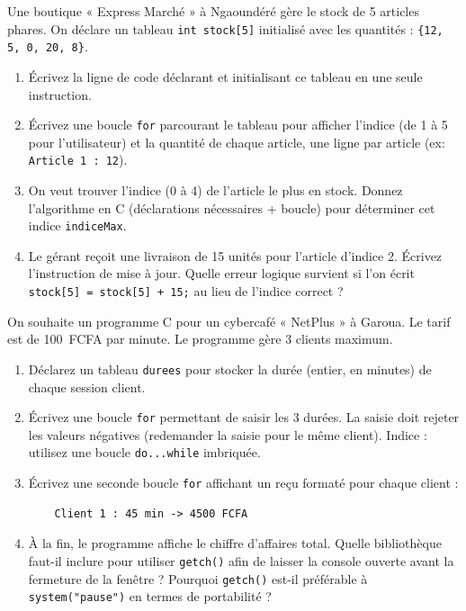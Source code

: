\documentclass[11pt]{article}
\begin{document}
\begin{exercice}
Une boutique « Express Marché » à Ngaoundéré gère le stock de 5 articles phares. On déclare un tableau \texttt{int stock[5]} initialisé avec les quantités : \texttt{\{12, 5, 0, 20, 8\}}.
\begin{enumerate}
    \item Écrivez la ligne de code déclarant et initialisant ce tableau en une seule instruction.
    \item Écrivez une boucle \texttt{for} parcourant le tableau pour afficher l'indice (de 1 à 5 pour l'utilisateur) et la quantité de chaque article, une ligne par article (ex: \texttt{Article 1 : 12}).
    \item On veut trouver l'indice (0 à 4) de l'article le plus en stock. Donnez l'algorithme en C (déclarations nécessaires + boucle) pour déterminer cet indice \texttt{indiceMax}.
    \item Le gérant reçoit une livraison de 15 unités pour l'article d'indice 2. Écrivez l'instruction de mise à jour. Quelle erreur logique survient si l'on écrit \texttt{stock[5] = stock[5] + 15;} au lieu de l'indice correct ?
\end{enumerate}
\end{exercice}

\begin{exercice}
On souhaite un programme C pour un cybercafé « NetPlus » à Garoua. Le tarif est de \SI{100}{FCFA} par minute. Le programme gère 3 clients maximum.
\begin{enumerate}
    \item Déclarez un tableau \texttt{durees} pour stocker la durée (entier, en minutes) de chaque session client.
    \item Écrivez une boucle \texttt{for} permettant de saisir les 3 durées. La saisie doit rejeter les valeurs négatives (redemander la saisie pour le même client). Indice : utilisez une boucle \texttt{do...while} imbriquée.
    \item Écrivez une seconde boucle \texttt{for} affichant un reçu formaté pour chaque client :
    \begin{verbatim}
    Client 1 : 45 min -> 4500 FCFA
    \end{verbatim}
    \item À la fin, le programme affiche le chiffre d'affaires total. Quelle bibliothèque faut-il inclure pour utiliser \texttt{getch()} afin de laisser la console ouverte avant la fermeture de la fenêtre ? Pourquoi \texttt{getch()} est-il préférable à \texttt{system("pause")} en termes de portabilité ?
\end{enumerate}
\end{exercice}
\end{document}
